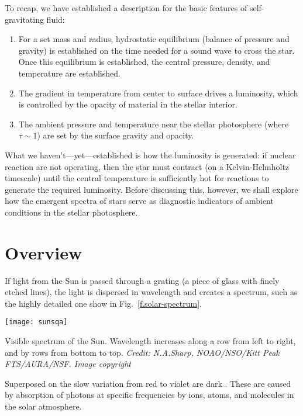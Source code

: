 
\nocite{Mihalas1978Stellar-Atmosph,LeBlanc2010An-Introduction,Carroll2006An-Introduction}

To recap, we have established a description for the basic features of self-gravitating fluid:
\begin{enumerate}

\item For a set mass and radius, hydrostatic equilibrium (balance of pressure and gravity) is established on the time needed for a sound wave to cross the star. Once this equilibrium is established, the central pressure, density, and temperature are established.

\item The gradient in temperature from center to surface drives a luminosity, which is controlled by the opacity of material in the stellar interior.

\item The ambient pressure and temperature near the stellar photosphere (where $\tau \sim 1$) are set by the surface gravity and opacity.

\end{enumerate}

What we haven't---yet---established is how the luminosity is generated: if nuclear reaction are not operating, then the star must contract (on a Kelvin-Helmholtz timescale) until the central temperature is sufficiently hot for reactions to generate the required luminosity.
Before discussing this, however, we shall explore how the emergent spectra of stars serve as diagnostic indicators of ambient conditions in the stellar photosphere. 

\section{Overview}

If light from the Sun is passed through a grating (a piece of glass with finely etched lines), the light is dispersed in wavelength and creates a spectrum, such as the highly detailed one show in Fig.~\ref{f.solar-spectrum}. 
\begin{marginfigure}
\texttt{[image: sunsqa]}
\caption{\label{f.solar-spectrum} Visible spectrum of the Sun. Wavelength increases along a row from left to right, and by rows from bottom to top. \emph{Credit:
N.A.Sharp, NOAO/NSO/Kitt Peak FTS/AURA/NSF. Image copyright }}
\end{marginfigure}
Superposed on the slow variation from red to violet are dark . These are caused by absorption of photons at specific frequencies by ions, atoms, and molecules in the solar atmosphere.

